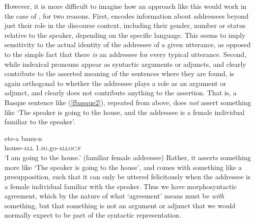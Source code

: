 \documentclass[output=paper, modfonts, nonflat]{langsci/langscibook}
\begin{document}
However, it is more difficult to imagine how an approach like this
would work in the case of \allagr, for two reasons. First, \allagr{}
encodes information about addressees beyond just their role in the
discourse context, including their gender, number or status relative
to the speaker, depending on the specific language. This seems to
imply sensitivity to the actual identity of the addressee of a given
utterance, as opposed to the simple fact that there \emph{is} an
addressee for every typical utterance. Second, while indexical
pronouns appear as syntactic arguments or adjuncts, and clearly
contribute to the asserted meaning of the sentences where they are
found, \allagr{} is again orthogonal to whether the addressee plays a
role as an argument or adjunct, and clearly does not contribute
anything to the assertion. That is, a Basque sentence like
(\ref{fbasque2}), repeated from above, does \emph{not} assert
something like `The speaker is going to the house, and the addressee
is a female individual familiar to the speaker'.

\ea\label{fbasque2}\gll et\eS e-a banu-n\\
  house-\textsc{all}{} 1.\textsc{sg}.go-\textsc{alloc}:\textsc{f}\\
  \glt `I am going to the house.' (familiar female addressee)
\z
%
Rather, it asserts something more like `The speaker is going to the
house', and comes with something like a presupposition, such that it
can only be uttered felicitously when the addressee is a female
individual familiar with the speaker. Thus we have morphosyntactic
agreement, which by the nature of what `agreement' means must be
\emph{with} something, but that something is not an argument or
adjunct that we would normally expect to be part of the syntactic
representation.
\end{document}
